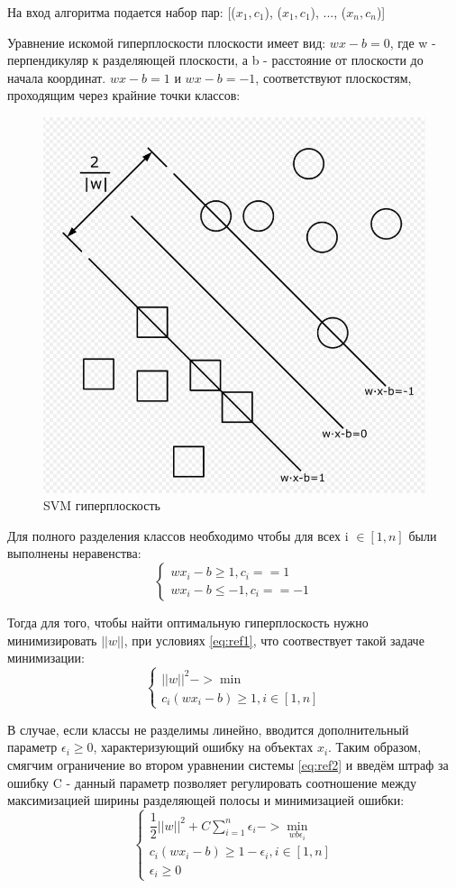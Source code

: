 На вход алгоритма подается набор пар: [($x_1, c_1$), ($x_1, c_1$), ..., ($x_n, c_n$)]

Уравнение искомой гиперплоскости плоскости имеет вид:
$wx - b = 0$, где w - перпендикуляр к разделяющей плоскости, а b - расстояние от плоскости до начала координат.\newline
$wx - b = 1$ и $wx - b = -1$, соответствуют плоскостям, проходящим через крайние точки классов:
\begin{figure}[!h]
	\centering
	\includegraphics[width=0.5\linewidth,height=0.5\linewidth]{pictures/screenshot021}
	\caption{SVM гиперплоскость}
	\label{fig:screenshot021}
\end{figure}

Для полного разделения классов необходимо чтобы для всех i $\in [1, n]$ были выполнены неравенства:
\begin{equation}
\begin{cases}
wx_i - b \ge 1, c_i == 1 \\
wx_i - b \le -1, c_i == -1
\end{cases}
\label{eq:ref1}
\end{equation}

Тогда для того, чтобы найти оптимальную гиперплоскость нужно минимизировать $||w||$, при условиях \ref{eq:ref1}, что соотвествует такой задаче минимизации:
\begin{equation}
\begin{cases}
||w||^2 -> \min \\
c_i(wx_i - b) \ge 1, i \in [1, n]
\end{cases}
\label{eq:ref2}
\end{equation}

В случае, если классы не разделимы линейно, вводится дополнительный параметр $\epsilon_i \ge 0$, характеризующий ошибку на объектах $x_i$. Таким образом, смягчим ограничение во втором уравнении системы \ref{eq:ref2} и введём штраф за ошибку C - данный параметр позволяет регулировать соотношение между максимизацией ширины разделяющей полосы и минимизацией ошибки:
\begin{equation}
\begin{cases}
\dfrac{1}{2}||w||^2 + C\sum_{i=1}^{n}\epsilon_i -> \min_{wb\epsilon_i} \\
c_i(wx_i - b) \ge 1 - \epsilon_i, i \in [1, n] \\
\epsilon_i \ge 0
\end{cases}
\label{eq:ref3}
\end{equation}

